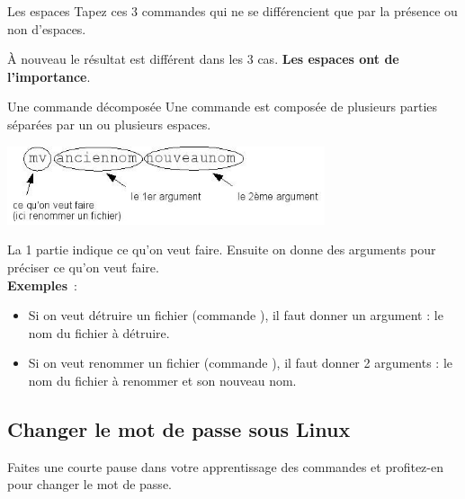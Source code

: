 \documentclass[a4paper,11pt]{style-esi/td}
\begin{document}
		\begin{Experience}{Les espaces} 
			Tapez ces 3 commandes qui ne se différencient 
			que par la présence ou non d'espaces.
			\begin{steps}
			\item {}
			\item {}
			\item {}
			\end{steps}
			À nouveau le résultat est différent dans les 3 cas. 
			\textbf{Les espaces ont de l'importance}.
		\end{Experience}				

		\begin{theorie}{Une commande décomposée}
			Une commande est composée de plusieurs parties 
			séparées par un ou plusieurs espaces. 
			\begin{center}
				\includegraphics[width=0.7\textwidth]{images/commande.jpg}
			\end{center}
			La 1\iere{} partie indique ce qu'on veut faire. 
			Ensuite on donne des arguments pour préciser ce qu'on veut faire.
			\\
			\textbf{Exemples} :
			\begin{itemize}
			\item 
				Si on veut détruire un fichier (commande ), 
				il faut donner un argument : le nom du fichier à détruire.
			\item 
				Si on veut renommer un fichier (commande ), 
				il faut donner 2 arguments : 
				le nom du fichier à renommer et son nouveau nom.
			\end{itemize}
		\end{theorie}

	\subsection{Changer le mot de passe sous Linux}

		Faites une courte pause dans votre apprentissage des commandes
		et profitez-en pour changer le mot de passe.
\end{document}
